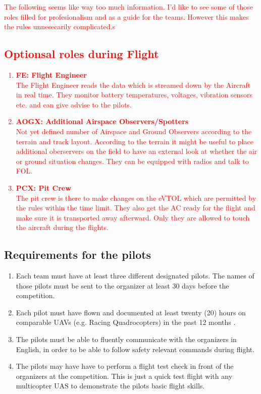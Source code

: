     \textcolor{red}{The following seems like way too much information. I'd like to see some of those roles filled for profesionalism and as a guide for the teams. However this makes the rules unnesecarily complicated.s
    \subsection{Optionsal roles during Flight}
    \begin{enumerate}
      \item \textbf{FE: Flight Engineer}\\The Flight Engineer reads the data which is streamed down by the Aircraft in real time. They monitor battery temperatures, voltages, vibration sensors etc. and can give advise to the pilots.
      \item \textbf{AOGX: Additional Airspace Observers/Spotters}\\Not yet defined number of Airspace and Ground Observers according to the terrain and track layout.
      According to the terrain it might be useful to place additional oberservers on the field to have an external look at whether the air or ground situation changes. They can be equipped with radios and talk to FOL.
      \item \textbf{PCX: Pit Crew }\\The pit crew is there to make changes on the eVTOL which are permitted by the rules within the time limit. They also get the AC ready for the flight and make sure it is transported away afterward. Only they are allowed to touch the aircraft during the flights. 
    \end{enumerate}
    }

    \subsection{Requirements for the pilots}
    \begin{enumerate}
      \item Each team must have at least three different designated pilots. The names of those pilots must be sent to the organizer at least 
      30 days before the competition. 
      \item Each pilot must have flown and documented at least twenty (20) hours on comparable UAVs (e.g. Racing Quadrocopters) in the past 12 months \label{SubSec:PilotRequirements}.  
      \item The pilots must be able to fluently communicate with the organizers in English, in order to be able to follow safety relevant commands during flight.
      \item The pilots may have have to perform a flight test check in front of the organizers at the competition. This is just a quick test flight with any multicopter UAS to demonstrate the pilots basic flight skills.
    \end{enumerate}

